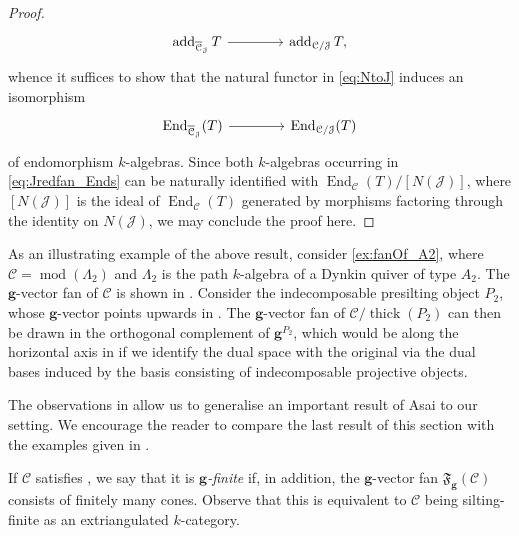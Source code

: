\documentclass[10pt,twoside, a4paper,reqno]{amsart}
\DeclareMathOperator{\mods}{mod}
\DeclareMathOperator{\End}{End}
\DeclareMathOperator{\add}{add}
\DeclareMathOperator{\thick}{thick}
\newcommand{\partfan}[1]{\mathfrak{F}_{\bfg}(#1)}
\newcommand{\calC}{\mathcal{C}}
\newcommand{\bfg}{\mathbf{g}}
\theoremstyle{definition}
\begin{document}
\begin{proof}
\begin{equation*}
\begin{tikzcd}[column sep=4em]
        \add_{\overline{\calC}_{\mathcal{J}}}T \arrow[r] & \add_{{\calC}/{\mathcal{J}}}T,
    \end{tikzcd}
    \end{equation*}
    whence it suffices to show that the natural functor in \eqref{eq:NtoJ} induces an isomorphism
    \begin{equation}\label{eq:Jredfan_Ends}
    \begin{tikzcd}[column sep=4em]
        \End_{\overline{\calC}_{\mathcal{J}}}(T) \arrow[r] & \End_{{\calC}/{\mathcal{J}}}(T)
    \end{tikzcd}
    \end{equation}
    of endomorphism $k$-algebras. Since both $k$-algebras occurring in \eqref{eq:Jredfan_Ends} can be naturally identified with $\End_{\calC}(T)/[N(\mathcal{J})]$, where $[N(\mathcal{J})]$ is the ideal of $\End_{\calC}(T)$ generated by morphisms factoring through the identity on $N(\mathcal{J})$, we may conclude the proof here.
\end{proof}

As an illustrating example of the above result, consider \eqref{ex:fanOf_A2}, where $\calC=\mods(\Lambda_2)$ and $\Lambda_2$ is the path $k$-algebra of a Dynkin quiver of type $A_2$. The $\bfg$-vector fan of $\calC$ is shown in . Consider the indecomposable presilting object $P_2$, whose $\bfg$-vector point{s} upwards in . The $\bfg$-vector fan of $\calC/\thick(P_2)$ can then be drawn in the orthogonal complement of $\bfg^{P_2}$, which would be along the horizontal axis in  if we identify the dual space with the original via the dual bases induced by the basis consisting of indecomposable projective objects.

The observations in  allow us to generalise an important result of Asai \cite[Thm. 4.7]{Asa21} to our setting. We encourage the reader to compare the last result of this section with the examples given in . 

If $\calC$ satisfies , we say that it is \textit{$\bfg$-finite} if, in addition, the $\bfg$-vector fan $\partfan{\calC}$ consists of finitely many cones. Observe that this is equivalent to $\calC$ being silting-finite as an extriangulated $k$-category.
\end{document}
